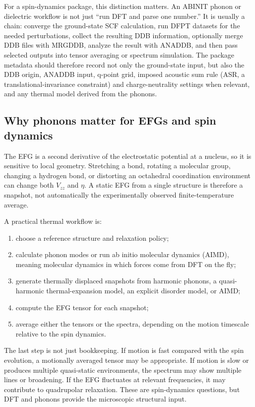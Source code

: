 \documentclass[11pt]{article}
\newcommand{\Vzz}{V_{zz}}
\newcommand{\etaEFG}{\eta}
\begin{document}
For a spin-dynamics package, this distinction matters.  An ABINIT phonon or dielectric workflow is not just ``run DFT and parse one number.''  It is usually a chain: converge the ground-state SCF calculation, run DFPT datasets for the needed perturbations, collect the resulting DDB information, optionally merge DDB files with MRGDDB, analyze the result with ANADDB, and then pass selected outputs into tensor averaging or spectrum simulation.  The package metadata should therefore record not only the ground-state input, but also the DDB origin, ANADDB input, q-point grid, imposed acoustic sum rule (ASR, a translational-invariance constraint) and charge-neutrality settings when relevant, and any thermal model derived from the phonons.

\subsection{Why phonons matter for EFGs and spin dynamics}

The EFG is a second derivative of the electrostatic potential at a nucleus, so it is sensitive to local geometry.  Stretching a bond, rotating a molecular group, changing a hydrogen bond, or distorting an octahedral coordination environment can change both $\Vzz$ and $\etaEFG$.  A static EFG from a single structure is therefore a snapshot, not automatically the experimentally observed finite-temperature average.

A practical thermal workflow is:
\begin{enumerate}
\item choose a reference structure and relaxation policy;
\item calculate phonon modes or run ab initio molecular dynamics (AIMD), meaning molecular dynamics in which forces come from DFT on the fly;
\item generate thermally displaced snapshots from harmonic phonons, a quasi-harmonic thermal-expansion model, an explicit disorder model, or AIMD;
\item compute the EFG tensor for each snapshot;
\item average either the tensors or the spectra, depending on the motion timescale relative to the spin dynamics.
\end{enumerate}

The last step is not just bookkeeping.  If motion is fast compared with the spin evolution, a motionally averaged tensor may be appropriate.  If motion is slow or produces multiple quasi-static environments, the spectrum may show multiple lines or broadening.  If the EFG fluctuates at relevant frequencies, it may contribute to quadrupolar relaxation.  These are spin-dynamics questions, but DFT and phonons provide the microscopic structural input.
\end{document}
